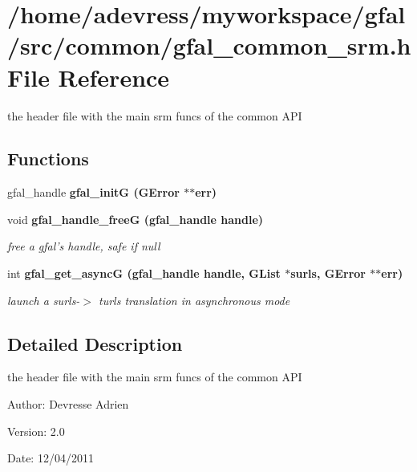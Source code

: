 \section{/home/adevress/myworkspace/gfal/src/common/gfal\_\-common\_\-srm.h File Reference}
\label{gfal__common__srm_8h}
the header file with the main srm funcs of the common API 

\subsection*{Functions}
\begin{CompactItemize}
\item 
gfal\_\-handle \bf{gfal\_\-init\-G} (GError $\ast$$\ast$err)
\item 
void \bf{gfal\_\-handle\_\-free\-G} (gfal\_\-handle handle)\label{gfal__common__srm_8h_9dbd943eaed291897d852fc3ae560058}

\begin{CompactList}\small\item\em free a gfal's handle, safe if null \item\end{CompactList}\item 
int \bf{gfal\_\-get\_\-async\-G} (gfal\_\-handle handle, GList $\ast$surls, GError $\ast$$\ast$err)
\begin{CompactList}\small\item\em launch a surls-$>$ turls translation in asynchronous mode \item\end{CompactList}\end{CompactItemize}


\subsection{Detailed Description}
the header file with the main srm funcs of the common API 

\begin{Desc}
\item[Author:]Devresse Adrien \end{Desc}
\begin{Desc}
\item[Version:]2.0 \end{Desc}
\begin{Desc}
\item[Date:]12/04/2011 \end{Desc}


